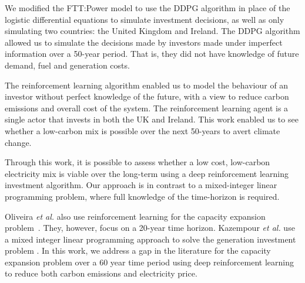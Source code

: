 \documentclass{article}
\begin{document}
We modified the FTT:Power model to use the DDPG algorithm in place of the logistic differential equations to simulate investment decisions, as well as only simulating two countries: the United Kingdom and Ireland. The DDPG algorithm allowed us to simulate the decisions made by investors made under imperfect information over a 50-year period. That is, they did not have knowledge of future demand, fuel and generation costs. 

The reinforcement learning algorithm enabled us to model the behaviour of an investor without perfect knowledge of the future, with a view to reduce carbon emissions and overall cost of the system. The reinforcement learning agent is a single actor that invests in both the UK and Ireland. This work enabled us to see whether a low-carbon mix is possible over the next 50-years to avert climate change.

Through this work, it is possible to assess whether a low cost, low-carbon electricity mix is viable over the long-term using a deep reinforcement learning investment algorithm. Our approach is in contrast to a mixed-integer linear programming problem, where full knowledge of the time-horizon is required.

Oliveira \textit{et al.} also use reinforcement learning for the capacity expansion problem~\cite{Oliveira2018}. They, however, focus on a 20-year time horizon. Kazempour \textit{et al.} use a mixed integer linear programming approach to solve the generation investment problem \cite{Kazempour2011}. In this work, we address a gap in the literature for the capacity expansion problem over a 60 year time period using deep reinforcement learning to reduce both carbon emissions and electricity price.




\end{document}
